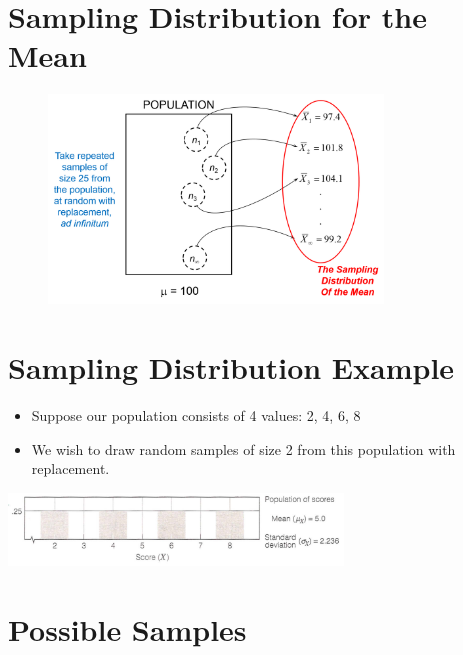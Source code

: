 \documentclass[12pt]{article}
\begin{document}
\section{Sampling Distribution for the
Mean}\label{sampling-distribution-for-the-mean}

\begin{figure}[H]
\centering
\includegraphics[width=3.5in]{sample_dist.png}
\caption{}
\end{figure}

\section{Sampling Distribution
Example}\label{sampling-distribution-example}

\begin{itemize}
\itemsep1pt\parskip0pt
\item
  Suppose our population consists of 4 values: 2, 4, 6, 8
\item
  We wish to draw random samples of size 2 from this population with
  replacement.
\end{itemize}
\includegraphics[width=3.5in]{sample_dist_population.png}

\section{Possible Samples}\label{possible-samples}
\end{document}
